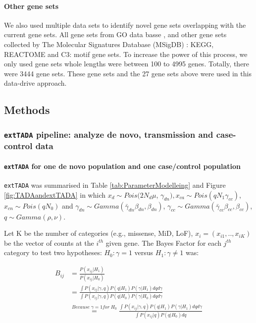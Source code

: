 \documentclass[]{article}
\begin{document}
\paragraph{Other gene sets}

We also used multiple data sets to identify novel gene sets
overlapping with the current gene sets. All gene sets from GO data
basse \citep{gene2015gene}, and other gene sets collected by The
Molecular Signatures Database (MSigDB) \citep{subramanian2005gene}:
 KEGG, REACTOME and C3: motif gene sets. To increase the power of this
 process, we only used gene sets whole lengths were between 100 to 4995
 genes. Totally, there were 3444 gene sets. These gene sets and the 27 gene sets above were used in this data-drive approach.

\subsection{Methods}

\normalsize

\subsubsection{\texttt{extTADA} pipeline: analyze de novo, transmission and case-control data}


\paragraph{\texttt{extTADA} for one de novo population and one case/control
  population}

\texttt{extTADA} was summarised in Table \ref{tab:ParameterModelleing}
and Figure \ref{fig:TADAandextTADA} in which $x_d \sim Pois(2N_d\mu$,
$\gamma_{dn}), x_{ca} \sim Pois(qN_1\gamma_{cc})$, $x_{cn} \sim
Pois(qN_0)$ and $\gamma_{dn} \sim Gamma(\bar{\gamma}_{dn}\beta_{dn},
\beta_{dn})$, $\gamma_{cc} \sim Gamma(\bar{\gamma}_{cc}\beta_{cc},
\beta_{cc})$, $q \sim Gamma(\rho, \nu)$.



Let K be the number of categories (e.g., missense, MiD, LoF), $x_i =
(x_{i1}, .., x_{iK})$ be the vector of counts at the $i^{th}$ given
gene. The Bayes Factor for each $j^{th}$ category to test two hypotheses: $H_0: \gamma = 1$ versus $H_1:
\gamma \neq 1$ was:

\begin{equation}
\begin{array}{ll}
B_{ij} & = \frac{P(x_{ij}|H_1)}{P(x_{ij}|H_0)} \\
 & = \frac{\int P(x_{ij}|\gamma, q)P(q|H_1)P(\gamma|H_1) dq d\gamma}{\int P(x_{ij}|\gamma, q)P(q|H_0)P(\gamma|H_0) dq d\gamma} \\
 & \stackrel{Because\; \gamma = 1 for\; H_{0}}{=} \frac{\int P(x_{ij}|\gamma, q)P(q|H_1)P(\gamma|H_1) dq d\gamma}{\int P(x_{ij}| q)P(q|H_0)dq}
\end{array}
\label{eq:bayesfactorij}
\end{equation}
\end{document}

